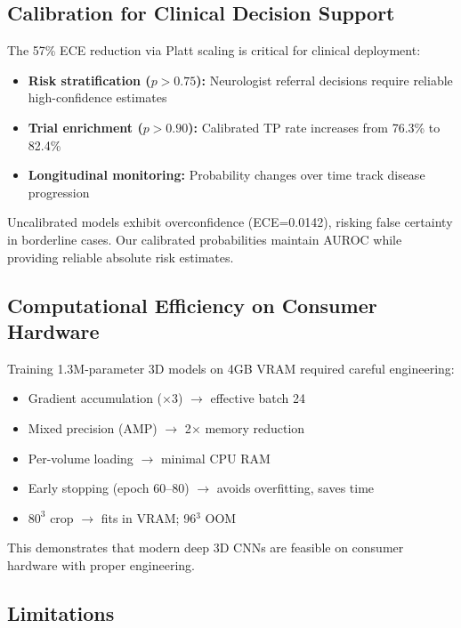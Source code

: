 \subsection{Calibration for Clinical Decision Support}
\label{sec:cal_clinical_discussion}

The 57\% ECE reduction via Platt scaling is critical for clinical deployment:
\begin{itemize}
    \item \textbf{Risk stratification ($p > 0.75$):} Neurologist referral decisions require reliable high-confidence estimates
    \item \textbf{Trial enrichment ($p > 0.90$):} Calibrated TP rate increases from 76.3\% to 82.4\%
    \item \textbf{Longitudinal monitoring:} Probability changes over time track disease progression
\end{itemize}

Uncalibrated models exhibit overconfidence (ECE=0.0142), risking false certainty in borderline cases. Our calibrated probabilities maintain AUROC while providing reliable absolute risk estimates.

\subsection{Computational Efficiency on Consumer Hardware}
\label{sec:compute}

Training 1.3M-parameter 3D models on 4GB VRAM required careful engineering:
\begin{itemize}
    \item Gradient accumulation ($\times$3) $\to$ effective batch 24
    \item Mixed precision (AMP) $\to$ 2$\times$ memory reduction
    \item Per-volume loading $\to$ minimal CPU RAM
    \item Early stopping (epoch 60--80) $\to$ avoids overfitting, saves time
    \item $80^3$ crop $\to$ fits in VRAM; 96$^3$ OOM
\end{itemize}

This demonstrates that modern deep 3D CNNs are feasible on consumer hardware with proper engineering.

\subsection{Limitations}
\label{sec:limitations}

